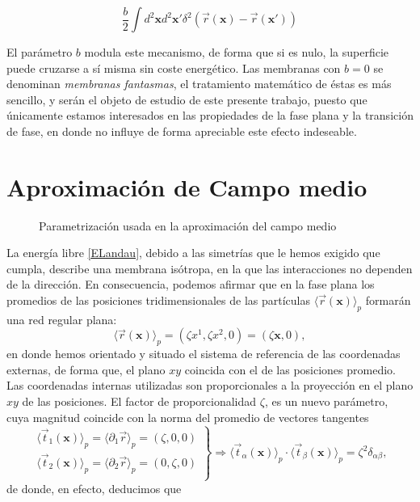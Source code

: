 \begin{equation*}
\frac{b}{2}\int d^2\mathbf{x} d^2\mathbf{x'}
\delta^2(\vec{r}(\mathbf{x})-\vec{r}(\mathbf{x'}))
\end{equation*}

El parámetro $b$ modula este mecanismo, de forma que si es nulo, la superficie
puede cruzarse a sí misma sin coste energético. Las membranas con $b=0$ se
denominan \textit{membranas fantasmas}, el tratamiento matemático de éstas es
 más sencillo, y serán el objeto de estudio de este presente
trabajo, puesto que únicamente estamos interesados en las propiedades de la
fase plana y la transición de fase, en donde no influye de forma apreciable
este efecto indeseable. 

\section{Aproximación de Campo medio}

\begin{figure}[h]
\centering
 \resizebox{\columnwidth}{!}{}
\caption{Parametrización usada en la aproximación del campo medio}
\end{figure}

La energía libre \eqref{ELandau}, debido a las simetrías que le hemos exigido
que cumpla, describe una membrana isótropa, en la que las interacciones no
dependen de la dirección. En consecuencia, podemos afirmar que en la fase
plana los promedios de las posiciones tridimensionales de las partículas
$\langle\vec{r}(\mathbf{x})\rangle_{p}$ formarán una red regular plana:  
\begin{equation*}
 \langle\vec{r}(\mathbf{x})\rangle_{p}=(\zeta x^1,\zeta x^2,0)=(\zeta \mathbf{x},0), 
\end{equation*}
en donde hemos orientado y situado el sistema de referencia de las coordenadas
externas, de forma que, el plano $xy$ coincida con el de las
posiciones promedio. Las coordenadas internas utilizadas son 
proporcionales a la proyección en el plano $xy$ de las posiciones. El factor
de proporcionalidad $\zeta$, es un nuevo parámetro, cuya magnitud coincide con
la norma del promedio de  vectores tangentes 
\begin{equation}
 \left.\begin{array}{c}
\langle\vec{t}_{1}(\mathbf{x})\rangle_{p}=\langle\partial_1\vec{r}\rangle_{p}=(\zeta ,0,0)\\
\langle\vec{t}_{2}(\mathbf{x})\rangle_{p}=\langle\partial_2\vec{r}\rangle_{p}=(0,\zeta ,0)\\
 \end{array}\right\}\Rightarrow
\langle\vec{t}_{\alpha}(\mathbf{x})\rangle_{p}\cdot\langle\vec{t}_{\beta}(\mathbf{x})\rangle_{p}=\zeta^2 \delta_{\alpha\beta},
\end{equation}
de donde, en efecto, deducimos que

